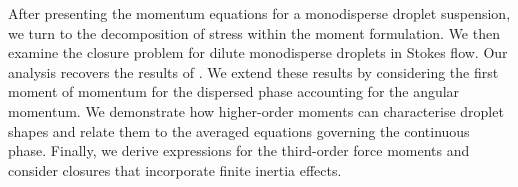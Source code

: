 





After presenting the momentum equations for a monodisperse droplet suspension, we turn to the decomposition of stress within the moment formulation. 
We then examine the closure problem for dilute monodisperse droplets in Stokes flow. 
Our analysis recovers the results of \citet[Appendix B]{zhang1997momentum}. We extend these results by considering the first moment of momentum for the dispersed phase accounting for the angular momentum. We demonstrate how higher-order moments can characterise droplet shapes and relate them to the averaged equations governing the continuous phase. 
Finally, we derive expressions for the third-order force moments and consider closures that incorporate finite inertia effects.



